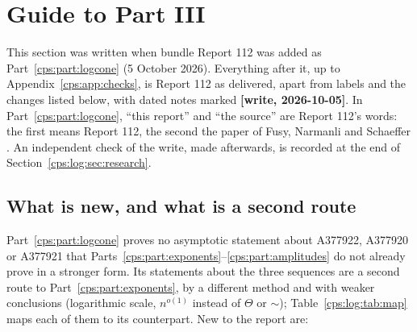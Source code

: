 \documentclass[11pt,letterpaper]{article}
\numberwithin{equation}{section}
\theoremstyle{remark}\newtheorem{remark}[theorem]{Remark}
\begin{document}
\section{Guide to Part III}\label{cps:log:sec:guide}
This section was written when bundle Report 112 was added as Part~\ref{cps:part:logcone}
(5 October 2026). Everything after it, up to Appendix~\ref{cps:app:checks}, is Report 112 as
delivered, apart from labels and the changes listed below, with dated notes marked
\textbf{[write, 2026-10-05]}. In Part~\ref{cps:part:logcone}, ``this report'' and ``the
source'' are Report 112's words: the first means Report 112, the second the paper of
Fusy, Narmanli and Schaeffer \cite{FNS}. An independent check of the write, made afterwards, is
recorded at the end of Section~\ref{cps:log:sec:research}.

\subsection{What is new, and what is a second route}\label{cps:log:sec:new}
Part~\ref{cps:part:logcone} proves no asymptotic statement about A377922, A377920 or A377921
that Parts~\ref{cps:part:exponents}--\ref{cps:part:amplitudes} do not already prove in a
stronger form. Its statements about the three sequences are a second route to
Part~\ref{cps:part:exponents}, by a different method and with weaker conclusions (logarithmic
scale, $n^{o(1)}$ instead of $\Theta$ or $\sim$); Table~\ref{cps:log:tab:map} maps each of them to
its counterpart. New to the report are:
\end{document}
